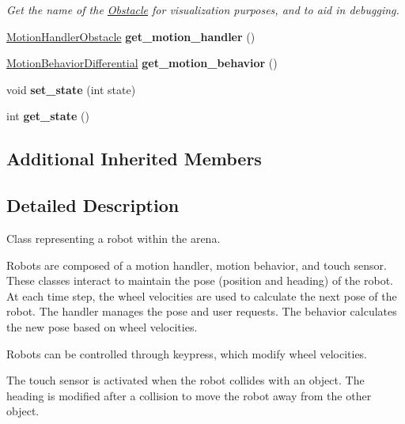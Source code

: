 \begin{DoxyCompactItemize}
\begin{DoxyCompactList}\small\item\em Get the name of the \hyperlink{classObstacle}{Obstacle} for visualization purposes, and to aid in debugging. \end{DoxyCompactList}\item 
\hyperlink{classMotionHandlerObstacle}{Motion\+Handler\+Obstacle} {\bfseries get\+\_\+motion\+\_\+handler} ()\hypertarget{classObstacle_a3733568b7023389407d9d8cea358b329}{}\label{classObstacle_a3733568b7023389407d9d8cea358b329}

\item 
\hyperlink{classMotionBehaviorDifferential}{Motion\+Behavior\+Differential} {\bfseries get\+\_\+motion\+\_\+behavior} ()\hypertarget{classObstacle_aab71c0b9c09fa1c1429b3896a7adfb7c}{}\label{classObstacle_aab71c0b9c09fa1c1429b3896a7adfb7c}

\item 
void {\bfseries set\+\_\+state} (int state)\hypertarget{classObstacle_a4207ff28b8118bfa76cbca93b1f2eaeb}{}\label{classObstacle_a4207ff28b8118bfa76cbca93b1f2eaeb}

\item 
int {\bfseries get\+\_\+state} ()\hypertarget{classObstacle_ae3f5da08a3b62a6fc8a39d90200d511a}{}\label{classObstacle_ae3f5da08a3b62a6fc8a39d90200d511a}

\end{DoxyCompactItemize}
\subsection*{Additional Inherited Members}


\subsection{Detailed Description}
Class representing a robot within the arena. 

Robots are composed of a motion handler, motion behavior, and touch sensor. These classes interact to maintain the pose (position and heading) of the robot. At each time step, the wheel velocities are used to calculate the next pose of the robot. The handler manages the pose and user requests. The behavior calculates the new pose based on wheel velocities.

Robots can be controlled through keypress, which modify wheel velocities.

The touch sensor is activated when the robot collides with an object. The heading is modified after a collision to move the robot away from the other object. 

